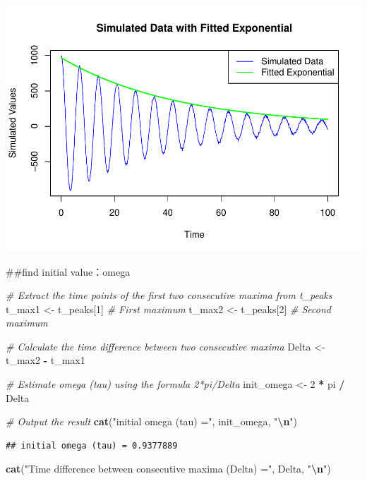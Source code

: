 \documentclass[
]{article}
\newenvironment{Shaded}{\begin{snugshade}}{\end{snugshade}}
\newcommand{\CommentTok}[1]{\textcolor[rgb]{0.56,0.35,0.01}{\textit{#1}}}
\newcommand{\DecValTok}[1]{\textcolor[rgb]{0.00,0.00,0.81}{#1}}
\newcommand{\FunctionTok}[1]{\textcolor[rgb]{0.13,0.29,0.53}{\textbf{#1}}}
\newcommand{\NormalTok}[1]{#1}
\newcommand{\OtherTok}[1]{\textcolor[rgb]{0.56,0.35,0.01}{#1}}
\newcommand{\SpecialCharTok}[1]{\textcolor[rgb]{0.81,0.36,0.00}{\textbf{#1}}}
\newcommand{\StringTok}[1]{\textcolor[rgb]{0.31,0.60,0.02}{#1}}
\begin{document}
\includegraphics{CircadianProjectForMcManus_files/figure-latex/unnamed-chunk-11-1.pdf}

\#\#find initial value：omega

\begin{Shaded}
\begin{Highlighting}[]
\CommentTok{\# Extract the time points of the first two consecutive maxima from t\_peaks}
\NormalTok{t\_max1 }\OtherTok{\textless{}{-}}\NormalTok{ t\_peaks[}\DecValTok{1}\NormalTok{]  }\CommentTok{\# First maximum}
\NormalTok{t\_max2 }\OtherTok{\textless{}{-}}\NormalTok{ t\_peaks[}\DecValTok{2}\NormalTok{]  }\CommentTok{\# Second maximum}

\CommentTok{\# Calculate the time difference between two consecutive maxima}
\NormalTok{Delta }\OtherTok{\textless{}{-}}\NormalTok{ t\_max2 }\SpecialCharTok{{-}}\NormalTok{ t\_max1}

\CommentTok{\# Estimate omega (tau) using the formula 2*pi/Delta}
\NormalTok{init\_omega }\OtherTok{\textless{}{-}} \DecValTok{2} \SpecialCharTok{*}\NormalTok{ pi }\SpecialCharTok{/}\NormalTok{ Delta}

\CommentTok{\# Output the result}
\FunctionTok{cat}\NormalTok{(}\StringTok{"initial omega (tau) ="}\NormalTok{, init\_omega, }\StringTok{"}\SpecialCharTok{\textbackslash{}n}\StringTok{"}\NormalTok{)}
\end{Highlighting}
\end{Shaded}

\begin{verbatim}
## initial omega (tau) = 0.9377889
\end{verbatim}

\begin{Shaded}
\begin{Highlighting}[]
\FunctionTok{cat}\NormalTok{(}\StringTok{"Time difference between consecutive maxima (Delta) ="}\NormalTok{, Delta, }\StringTok{"}\SpecialCharTok{\textbackslash{}n}\StringTok{"}\NormalTok{)}
\end{Highlighting}
\end{Shaded}
\end{document}
